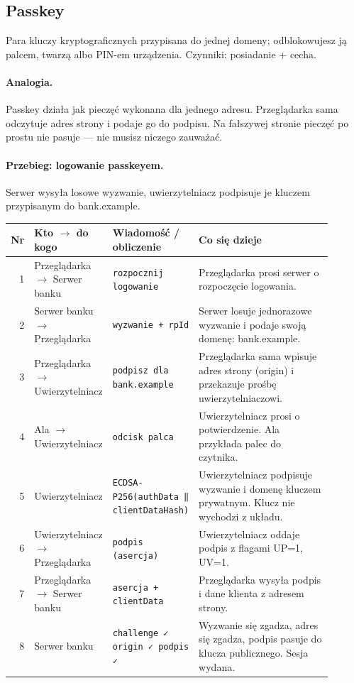 \subsection{Passkey}
\label{sec:mech-passkey}
Para kluczy kryptograficznych przypisana do jednej domeny; odblokowujesz ją palcem, twarzą albo PIN-em urządzenia. Czynniki: posiadanie + cecha. \cite{S1,S2,P4,P5,P6,R2,N1,A1,W3}

\paragraph{Analogia.} Passkey działa jak pieczęć wykonana dla jednego adresu. Przeglądarka sama odczytuje adres strony i podaje go do podpisu. Na fałszywej stronie pieczęć po prostu nie pasuje — nie musisz niczego zauważać.

\paragraph{Przebieg: logowanie passkeyem.} Serwer wysyła losowe wyzwanie, uwierzytelniacz podpisuje je kluczem przypisanym do bank.example.
\begingroup\footnotesize
\begin{longtable}{@{}r p{0.2\linewidth} p{0.24\linewidth} p{0.46\linewidth}@{}}
\toprule
Nr & Kto $\rightarrow$ do kogo & Wiadomość / obliczenie & Co się dzieje \\
\midrule
\endhead
1 & Przeglądarka $\rightarrow$ Serwer banku & \texttt{rozpocznij logowanie} & Przeglądarka prosi serwer o rozpoczęcie logowania. \\
2 & Serwer banku $\rightarrow$ Przeglądarka & \texttt{wyzwanie + rpId} & Serwer losuje jednorazowe wyzwanie i podaje swoją domenę: bank.example. \\
3 & Przeglądarka $\rightarrow$ Uwierzytelniacz & \texttt{podpisz dla bank.example} & Przeglądarka sama wpisuje adres strony (origin) i przekazuje prośbę uwierzytelniaczowi. \\
4 & Ala $\rightarrow$ Uwierzytelniacz & \texttt{odcisk palca} & Uwierzytelniacz prosi o potwierdzenie. Ala przykłada palec do czytnika. \\
5 & Uwierzytelniacz & \texttt{ECDSA-P256(authData ‖ clientDataHash)} & Uwierzytelniacz podpisuje wyzwanie i domenę kluczem prywatnym. Klucz nie wychodzi z układu. \\
6 & Uwierzytelniacz $\rightarrow$ Przeglądarka & \texttt{podpis (asercja)} & Uwierzytelniacz oddaje podpis z flagami UP=1, UV=1. \\
7 & Przeglądarka $\rightarrow$ Serwer banku & \texttt{asercja + clientData} & Przeglądarka wysyła podpis i dane klienta z adresem strony. \\
8 & Serwer banku & \texttt{challenge ✓  origin ✓  podpis ✓} & Wyzwanie się zgadza, adres się zgadza, podpis pasuje do klucza publicznego. Sesja wydana. \\
\bottomrule
\end{longtable}
\endgroup

